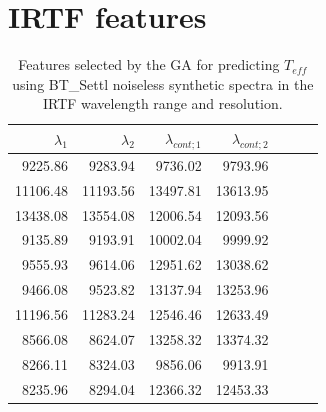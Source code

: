 
  \section{IRTF features}
\label{app:features:irtf}
\begin{table}
\begin{center}
\begin{tabular}{rrrrrrr}
  \hline
  $\lambda_1$ & $\lambda_2$ & $\lambda_{cont;1}$ & $\lambda_{cont;2} $ \\ 
  \hline
9225.86  & 9283.94   & 9736.02  & 9793.96 \\
11106.48 & 11193.56  & 13497.81 & 13613.95 \\
13438.08 & 13554.08  & 12006.54 & 12093.56 \\
9135.89  & 9193.91   & 10002.04 & 9999.92 \\
9555.93  & 9614.06   & 12951.62 & 13038.62 \\
9466.08  & 9523.82   & 13137.94 & 13253.96 \\
11196.56 & 11283.24  & 12546.46 & 12633.49 \\
8566.08  & 8624.07   & 13258.32 & 13374.32 \\
8266.11  & 8324.03   & 9856.06  & 9913.91 \\
8235.96  & 8294.04   & 12366.32 & 12453.33 \\
\hline
\end{tabular}
\caption {Features selected by the GA for predicting $T_{eff}$ using
  BT\_Settl noiseless synthetic spectra in the IRTF wavelength range
  and resolution. } \label{tab:irtf-teff-noiseless}
\end{center}
\end{table}

